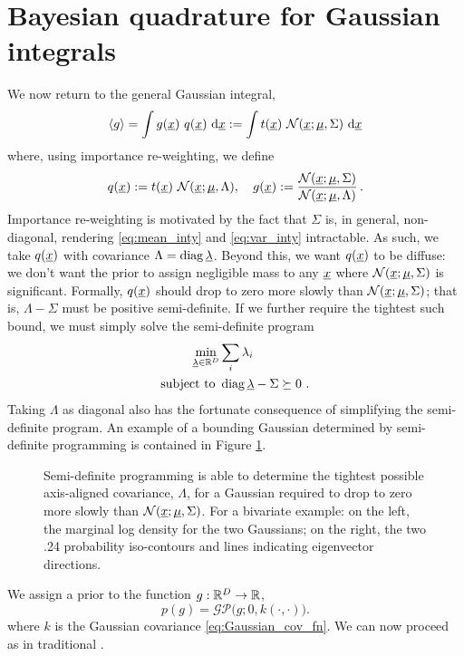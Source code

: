 \documentclass[twoside]{article}
\begin{document}
\section{Bayesian quadrature for Gaussian integrals}

We now return to the general Gaussian integral,
\begin{equation}\label{eq:top_hat_inty_g}
 \langle g \rangle=\int g(\underline{\smash{x}})~q(\underline{\smash{x}})~\mathrm{d} \underline{\smash{x}}:= \int t(\underline{\smash{x}})~\mathcal{N}(\underline{\smash{x}};\underline{\smash{\mu}},\Sigma)~\mathrm{d} \underline{\smash{x}}
\end{equation}
where, using importance re-weighting, we define
\begin{equation}
 q(\underline{\smash{x}}):= t(\underline{\smash{x}})~\mathcal{N}(\underline{\smash{x}};\underline{\smash{\mu}},\Lambda), \quad g(\underline{\smash{x}}) := \frac{\mathcal{N}(\underline{\smash{x}};\underline{\smash{\mu}},\Sigma)}{\mathcal{N}(\underline{\smash{x}};\underline{\smash{\mu}},\Lambda)}\,.
\end{equation}
Importance re-weighting is motivated by the fact that $\Sigma$ is, in general, non-diagonal, rendering \eqref{eq:mean_inty} and \eqref{eq:var_inty} intractable. As such, we take $q(\underline{\smash{x}})$ with covariance $\Lambda = \operatorname{diag} \underline{\smash{\lambda}}$. Beyond this, we want $q(\underline{\smash{x}})$ to be diffuse: we don't want the prior to assign negligible mass to any $\underline{\smash{x}}$ where $\mathcal{N}(\underline{\smash{x}};\underline{\smash{\mu}},\Sigma)$ is significant. Formally, $q(\underline{\smash{x}})$ should drop to zero more slowly than $\mathcal{N}(\underline{\smash{x}};\underline{\smash{\mu}},\Sigma)$;  that is, $\Lambda - \Sigma$ must be positive semi-definite. If we further require the tightest such bound, we must simply solve the semi-definite program
\begin{align}
 \min_{\underline{\smash{\lambda}}\in\mathbb{R}^D} & \sum_i \lambda_i\\
\text{subject to } & \operatorname{diag}{\underline{\smash{\lambda}}} - \Sigma \succeq 0~.
\end{align}
Taking $\Lambda$ as diagonal also has the fortunate consequence of simplifying the semi-definite program. An example of a bounding Gaussian determined by semi-definite programming is contained in Figure \ref{fig:bounding_ellipse}.

\begin{figure}
\caption{Semi-definite programming is able to determine the tightest possible axis-aligned covariance, $\Lambda$, for a Gaussian required to drop to zero more slowly than $\mathcal{N}(\underline{\smash{x}};\underline{\smash{\mu}},\Sigma)$. For a bivariate example: on the left, the marginal log density for the two Gaussians; on the right, the two .24 probability iso-contours and lines indicating eigenvector directions.}
\label{fig:bounding_ellipse}
\end{figure}

We assign a \gp prior 
to the function $g: \mathbb{R}^D \to \mathbb{R}$,
\begin{equation}
 p(g) = \mathcal{GP}\bigl(g; 0 , k(\cdot,\cdot)\bigr).
\end{equation}
 where $k$ is the Gaussian covariance \eqref{eq:Gaussian_cov_fn}. We can now proceed as in traditional \bq. 
\end{document}
